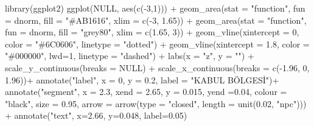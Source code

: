 \documentclass[
  12pt,
]{book}
\newenvironment{Shaded}{\begin{snugshade}}{\end{snugshade}}
\newcommand{\AttributeTok}[1]{\textcolor[rgb]{0.77,0.63,0.00}{#1}}
\newcommand{\ConstantTok}[1]{\textcolor[rgb]{0.00,0.00,0.00}{#1}}
\newcommand{\DecValTok}[1]{\textcolor[rgb]{0.00,0.00,0.81}{#1}}
\newcommand{\FloatTok}[1]{\textcolor[rgb]{0.00,0.00,0.81}{#1}}
\newcommand{\FunctionTok}[1]{\textcolor[rgb]{0.00,0.00,0.00}{#1}}
\newcommand{\NormalTok}[1]{#1}
\newcommand{\SpecialCharTok}[1]{\textcolor[rgb]{0.00,0.00,0.00}{#1}}
\newcommand{\StringTok}[1]{\textcolor[rgb]{0.31,0.60,0.02}{#1}}
\begin{document}
\begin{Shaded}
\begin{Highlighting}[]
\FunctionTok{library}\NormalTok{(ggplot2)}
\FunctionTok{ggplot}\NormalTok{(}\ConstantTok{NULL}\NormalTok{, }\FunctionTok{aes}\NormalTok{(}\FunctionTok{c}\NormalTok{(}\SpecialCharTok{{-}}\DecValTok{3}\NormalTok{,}\DecValTok{1}\NormalTok{))) }\SpecialCharTok{+}
  \FunctionTok{geom\_area}\NormalTok{(}\AttributeTok{stat =} \StringTok{"function"}\NormalTok{, }\AttributeTok{fun =}\NormalTok{ dnorm, }\AttributeTok{fill =} \StringTok{"\#AB1616"}\NormalTok{, }\AttributeTok{xlim =} \FunctionTok{c}\NormalTok{(}\SpecialCharTok{{-}}\DecValTok{3}\NormalTok{, }\FloatTok{1.65}\NormalTok{)) }\SpecialCharTok{+}
  \FunctionTok{geom\_area}\NormalTok{(}\AttributeTok{stat =} \StringTok{"function"}\NormalTok{, }\AttributeTok{fun =}\NormalTok{ dnorm, }\AttributeTok{fill =} \StringTok{"grey80"}\NormalTok{, }\AttributeTok{xlim =} \FunctionTok{c}\NormalTok{(}\FloatTok{1.65}\NormalTok{, }\DecValTok{3}\NormalTok{)) }\SpecialCharTok{+}
  \FunctionTok{geom\_vline}\NormalTok{(}\AttributeTok{xintercept =} \DecValTok{0}\NormalTok{, }\AttributeTok{color =} \StringTok{"\#6C0606"}\NormalTok{, }\AttributeTok{linetype =} \StringTok{"dotted"}\NormalTok{) }\SpecialCharTok{+}
  \FunctionTok{geom\_vline}\NormalTok{(}\AttributeTok{xintercept =} \FloatTok{1.8}\NormalTok{, }\AttributeTok{color =} \StringTok{"\#000000"}\NormalTok{, }\AttributeTok{lwd=}\DecValTok{1}\NormalTok{, }\AttributeTok{linetype =} \StringTok{"dashed"}\NormalTok{) }\SpecialCharTok{+}
  \FunctionTok{labs}\NormalTok{(}\AttributeTok{x =} \StringTok{"z"}\NormalTok{, }\AttributeTok{y =} \StringTok{""}\NormalTok{) }\SpecialCharTok{+}
  \FunctionTok{scale\_y\_continuous}\NormalTok{(}\AttributeTok{breaks =} \ConstantTok{NULL}\NormalTok{) }\SpecialCharTok{+}
  \FunctionTok{scale\_x\_continuous}\NormalTok{(}\AttributeTok{breaks =} \FunctionTok{c}\NormalTok{(}\SpecialCharTok{{-}}\FloatTok{1.96}\NormalTok{, }\DecValTok{0}\NormalTok{, }\FloatTok{1.96}\NormalTok{))}\SpecialCharTok{+}
  \FunctionTok{annotate}\NormalTok{(}\StringTok{"label"}\NormalTok{, }\AttributeTok{x =} \DecValTok{0}\NormalTok{, }\AttributeTok{y =} \FloatTok{0.2}\NormalTok{, }\AttributeTok{label =} \StringTok{"KABUL BÖLGESİ"}\NormalTok{)}\SpecialCharTok{+}
  \FunctionTok{annotate}\NormalTok{(}\StringTok{"segment"}\NormalTok{, }\AttributeTok{x =} \FloatTok{2.3}\NormalTok{, }\AttributeTok{xend =} \FloatTok{2.65}\NormalTok{, }\AttributeTok{y =} \FloatTok{0.015}\NormalTok{, }\AttributeTok{yend =}\FloatTok{0.04}\NormalTok{,}
           \AttributeTok{colour =} \StringTok{"black"}\NormalTok{, }\AttributeTok{size =} \FloatTok{0.95}\NormalTok{, }\AttributeTok{arrow =} \FunctionTok{arrow}\NormalTok{(}\AttributeTok{type =} \StringTok{"closed"}\NormalTok{, }\AttributeTok{length =} \FunctionTok{unit}\NormalTok{(}\FloatTok{0.02}\NormalTok{, }\StringTok{"npc"}\NormalTok{))) }\SpecialCharTok{+}
  \FunctionTok{annotate}\NormalTok{(}\StringTok{"text"}\NormalTok{, }\AttributeTok{x=}\FloatTok{2.66}\NormalTok{, }\AttributeTok{y=}\FloatTok{0.048}\NormalTok{, }\AttributeTok{label=}\StringTok{\textquotesingle{}0.05\textquotesingle{}}\NormalTok{)}
\end{Highlighting}
\end{Shaded}
\end{document}
